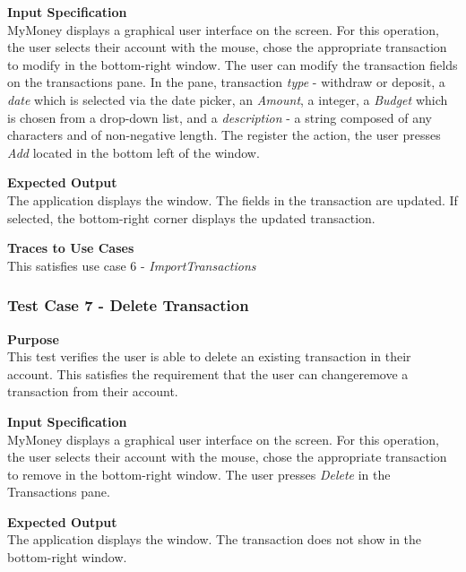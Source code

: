 \documentclass[12pt]{article}
\begin{document}
\noindent
{\bf Input Specification}\\
MyMoney displays a graphical user interface on the screen.
For this operation, the user selects their account with the mouse,
chose the appropriate transaction to modify in the bottom-right window.
The user can modify the transaction fields on the transactions pane.
In the pane, transaction \textit{type} - withdraw or deposit, a \textit{date}
which is selected via the date picker, an \textit{Amount}, a integer, a \textit{Budget} which is chosen
from a drop-down list, and a \textit{description} - a string composed of any characters and
of non-negative length. The register the action, the user presses \textit{Add} located in the bottom left
of the window.   
                                                          

\noindent
{\bf Expected Output}\\
The application displays the window.    
The fields in the transaction are updated.
If selected, the bottom-right corner displays the updated transaction.

\noindent
    {\bf Traces to Use Cases}\\
    This satisfies use case 6 - \textit{ImportTransactions}

\clearpage %


\subsubsection{Test Case 7 - Delete Transaction} \label{TC-7}
\noindent
{\bf Purpose}\\
This test verifies the user is able to delete an existing transaction in their account.
This satisfies the requirement that the user can changeremove a transaction from their account.
                                                        
\noindent
{\bf Input Specification}\\
MyMoney displays a graphical user interface on the screen.
For this operation, the user selects their account with the mouse,
chose the appropriate transaction to remove in the bottom-right window.
The user presses \textit{Delete} in the Transactions pane.
                                                          

\noindent
{\bf Expected Output}\\
The application displays the window.       
The transaction does not show in the bottom-right window.
\end{document}
